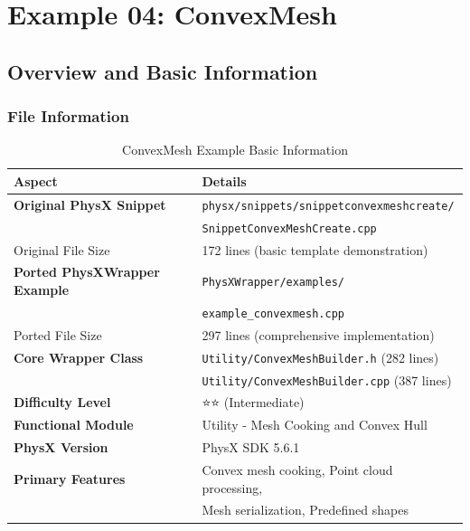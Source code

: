 
\section{Example 04: ConvexMesh}

\subsection{Overview and Basic Information}

\subsubsection{File Information}

\begin{table}[h]
\centering
\begin{tabular}{|l|l|}
\hline
\textbf{Aspect} & \textbf{Details} \\
\hline
\textbf{Original PhysX Snippet} & \texttt{physx/snippets/snippetconvexmeshcreate/} \\
 & \texttt{SnippetConvexMeshCreate.cpp} \\
\hline
Original File Size & 172 lines (basic template demonstration) \\
\hline
\textbf{Ported PhysXWrapper Example} & \texttt{PhysXWrapper/examples/} \\
 & \texttt{example\_convexmesh.cpp} \\
\hline
Ported File Size & 297 lines (comprehensive implementation) \\
\hline
\textbf{Core Wrapper Class} & \texttt{Utility/ConvexMeshBuilder.h} (282 lines) \\
 & \texttt{Utility/ConvexMeshBuilder.cpp} (387 lines) \\
\hline
\textbf{Difficulty Level} & ⭐⭐ (Intermediate) \\
\hline
\textbf{Functional Module} & Utility - Mesh Cooking and Convex Hull \\
\hline
\textbf{PhysX Version} & PhysX SDK 5.6.1 \\
\hline
\textbf{Primary Features} & Convex mesh cooking, Point cloud processing, \\
 & Mesh serialization, Predefined shapes \\
\hline
\end{tabular}
\caption{ConvexMesh Example Basic Information}
\end{table}


